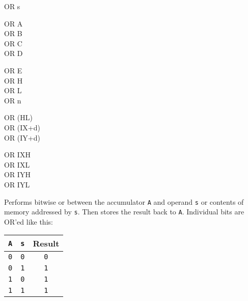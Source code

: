 \begin{basedescript}{
    \desclabelstyle{\multilinelabel}
    \desclabelwidth{3cm}}
\begin{DetailItem}{OR s}
        \begin{DetailVariants}[4]
            OR A\\
            OR B\\
            OR C\\
            OR D

            \columnbreak
            OR E\\
            OR H\\
            OR L\\
            OR n

            \columnbreak
            OR (HL)\\
            OR (IX+d)\\
            OR (IY+d)

            \columnbreak
            OR IXH\UNDOC\\
            OR IXL\UNDOC\\
            OR IYH\UNDOC\\
            OR IYL\UNDOC
        \end{DetailVariants}

        Performs bitwise or between the accumulator {\tt A} and operand {\tt s} or contents of memory addressed by {\tt s}. Then stores the result back to {\tt A}. Individual bits are OR'ed like this:

        \begin{tabular}{cc|c}
            {\tt A} & {\tt s} & Result \\
            \hline
            {\tt 0} & {\tt 0} & {\tt 0} \\
            {\tt 0} & {\tt 1} & {\tt 1} \\
            {\tt 1} & {\tt 0} & {\tt 1} \\
            {\tt 1} & {\tt 1} & {\tt 1} \\
        \end{tabular}

        \begin{DetailEffects}[p]
            \FlagsORr
        \end{DetailEffects}
				
        \begin{DetailTiming}
        \end{DetailTiming}

    \end{DetailItem}


\end{basedescript}
